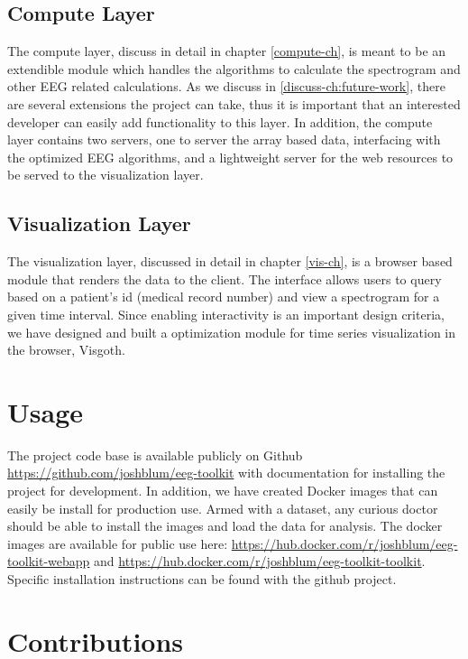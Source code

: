 \subsection{Compute Layer}

The compute layer, discuss in detail in chapter \ref{compute-ch}, is meant to be an
extendible module which handles the algorithms to calculate the spectrogram and
other EEG related calculations. As we discuss in \ref{discuss-ch:future-work},
there are several extensions the project can take, thus it is important that an
interested developer can easily add functionality to this layer. In addition,
the compute layer contains two servers, one to server the array based data,
interfacing with the optimized EEG algorithms, and a lightweight server for the
web resources to be served to the visualization layer.

\subsection{Visualization Layer}

The visualization layer, discussed in detail in chapter \ref{vis-ch}, is a browser
based module that renders the data to the client. The interface allows users to
query based on a patient's id (medical record number) and view a spectrogram
for a given time interval. Since enabling interactivity is an important design
criteria, we have designed and built a optimization module for time series
visualization in the browser, Visgoth.

\section{Usage}

The project code base is available publicly on Github \cite{github}
\url{https://github.com/joshblum/eeg-toolkit} with documentation for installing
the project for development. In addition, we have created Docker \cite{docker}
images that can easily be install for production use. Armed with a dataset, any
curious doctor should be able to install the images and load the data for
analysis. The docker images are available for public use here:
\url{https://hub.docker.com/r/joshblum/eeg-toolkit-webapp} and
\url{https://hub.docker.com/r/joshblum/eeg-toolkit-toolkit}. Specific
installation instructions can be found with the github project.

\section{Contributions}

